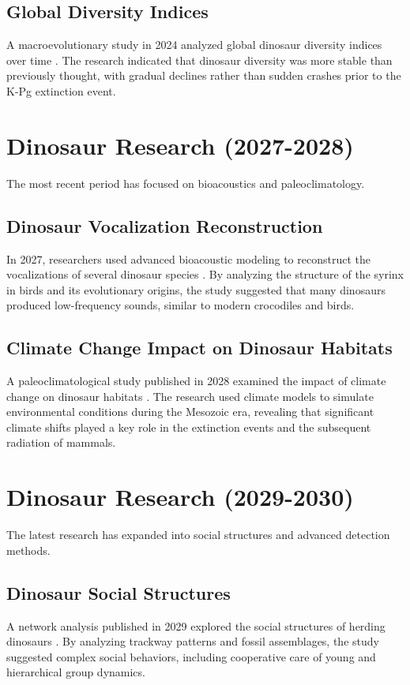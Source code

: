 \documentclass[12pt, a4paper]{article}
\begin{document}
\subsection{Global Diversity Indices}
A macroevolutionary study in 2024 analyzed global dinosaur diversity indices over time \cite{diversity_indices}. The research indicated that dinosaur diversity was more stable than previously thought, with gradual declines rather than sudden crashes prior to the K-Pg extinction event.

\section{Dinosaur Research (2027-2028)}

The most recent period has focused on bioacoustics and paleoclimatology.

\subsection{Dinosaur Vocalization Reconstruction}
In 2027, researchers used advanced bioacoustic modeling to reconstruct the vocalizations of several dinosaur species \cite{dinosaur_vocalization}. By analyzing the structure of the syrinx in birds and its evolutionary origins, the study suggested that many dinosaurs produced low-frequency sounds, similar to modern crocodiles and birds.

\subsection{Climate Change Impact on Dinosaur Habitats}
A paleoclimatological study published in 2028 examined the impact of climate change on dinosaur habitats \cite{climate_impact}. The research used climate models to simulate environmental conditions during the Mesozoic era, revealing that significant climate shifts played a key role in the extinction events and the subsequent radiation of mammals.

\section{Dinosaur Research (2029-2030)}

The latest research has expanded into social structures and advanced detection methods.

\subsection{Dinosaur Social Structures}
A network analysis published in 2029 explored the social structures of herding dinosaurs \cite{dinosaur_social}. By analyzing trackway patterns and fossil assemblages, the study suggested complex social behaviors, including cooperative care of young and hierarchical group dynamics.
\end{document}
